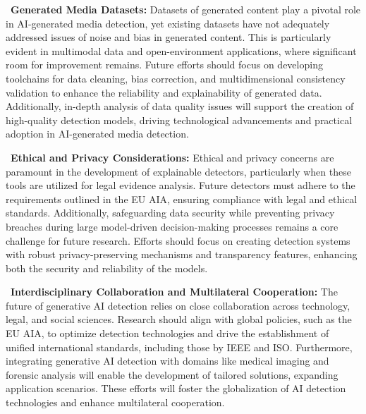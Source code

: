 ~\textbf{Generated Media Datasets:} Datasets of generated content play a pivotal role in AI-generated media detection, yet existing datasets have not adequately addressed issues of noise and bias in generated content. This is particularly evident in multimodal data and open-environment applications, where significant room for improvement remains. Future efforts should focus on developing toolchains for data cleaning, bias correction, and multidimensional consistency validation to enhance the reliability and explainability of generated data. Additionally, in-depth analysis of data quality issues will support the creation of high-quality detection models, driving technological advancements and practical adoption in AI-generated media detection.


~\textbf{Ethical and Privacy Considerations:} Ethical and privacy concerns are paramount in the development of explainable detectors, particularly when these tools are utilized for legal evidence analysis. Future detectors must adhere to the requirements outlined in the EU AIA, ensuring compliance with legal and ethical standards. Additionally, safeguarding data security while preventing privacy breaches during large model-driven decision-making processes remains a core challenge for future research. Efforts should focus on creating detection systems with robust privacy-preserving mechanisms and transparency features, enhancing both the security and reliability of the models.


~\textbf{Interdisciplinary Collaboration and Multilateral Cooperation:} The future of generative AI detection relies on close collaboration across technology, legal, and social sciences. Research should align with global policies, such as the EU AIA, to optimize detection technologies and drive the establishment of unified international standards, including those by IEEE and ISO. Furthermore, integrating generative AI detection with domains like medical imaging and forensic analysis will enable the development of tailored solutions, expanding application scenarios. These efforts will foster the globalization of AI detection technologies and enhance multilateral cooperation.